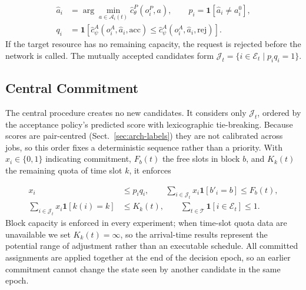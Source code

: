\documentclass[a4paper]{llncs}
\begin{document}
\begin{equation}
\begin{aligned}
\hat a_i&=\arg\min_{a\in\mathcal A_i(t)}
\hat c_{\theta}^{P}(o_i^P,a),\qquad
p_i=\mathbf 1[\hat a_i\ne a_i^0],\\
q_i&=\mathbf 1\!\left[
\hat c_{\psi}^{A}(o_i^A,\hat a_i,\mathrm{acc})
\le
\hat c_{\psi}^{A}(o_i^A,\hat a_i,\mathrm{rej})
\right].
\end{aligned}
\end{equation}
If the target resource has no remaining capacity, the request is
rejected before the network is called. The mutually accepted candidates
form $\mathcal J_t=\{i\in\mathcal E_t\mid p_iq_i=1\}$.

\subsection{Central Commitment}
\label{sec:arch-commit}
The central procedure creates no new candidates. It considers only
$\mathcal J_t$, ordered by the acceptance policy's predicted score with
lexicographic tie-breaking. Because scores are pair-centred
(Sect.~\ref{sec:arch-labels}) they are not calibrated across jobs, so this
order fixes a deterministic sequence rather than a priority. With $x_i\in\{0,1\}$ indicating commitment,
$F_b(t)$ the free slots in block $b$, and $K_k(t)$ the remaining quota
of time slot $k$, it enforces

\begin{equation}
\begin{aligned}
x_i&\le p_iq_i,\qquad
\sum_{i\in\mathcal J_t}\!x_i\mathbf1[b'_i\!=\!b]\le F_b(t),\\
\sum_{i\in\mathcal J_t}\!x_i\mathbf1[k(i)\!=\!k]&\le K_k(t),\qquad
\sum_{t\in\mathcal T}\!\mathbf1[i\in\mathcal E_t]\le1.
\end{aligned}
\end{equation}
Block capacity is enforced in every experiment; when time-slot quota
data are unavailable we set $K_k(t)=\infty$, so the arrival-time results
represent the potential range of adjustment rather than an executable
schedule. All committed assignments are applied together at the end of
the decision epoch, so an earlier commitment cannot change the state
seen by another candidate in the same epoch.
\end{document}
